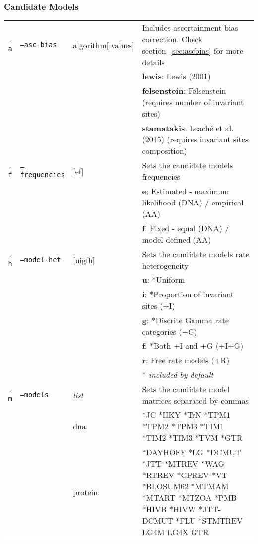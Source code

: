 \subsubsection{Candidate Models}

  \begin{tabular}{rllp{}}
    \hline
    \texttt{-a} & \texttt{--asc-bias} & algorithm[:values] & Includes ascertainment bias correction. Check section~\ref{sec:ascbias} for more details \\
                                     &&&  {\bf lewis}: Lewis (2001) \\
                                     &&&  {\bf felsenstein}: Felsenstein (requires number of invariant sites) \\
                                     &&&  {\bf stamatakis}: Leaché et al. (2015) (requires invariant sites composition) \\
     \texttt{-f} & \texttt{--frequencies} & [ef]           & Sets the candidate models frequencies \\
                                     &&& {\bf e}: Estimated - maximum likelihood (DNA) / empirical (AA) \\
                                     &&& {\bf f}: Fixed - equal (DNA) / model defined (AA) \\
     \texttt{-h} & \texttt{--model-het} & [uigfh] & Sets the candidate models rate heterogeneity \\
                                     &&& {\bf u}: *Uniform \\
                                     &&& {\bf i}: *Proportion of invariant sites (+I) \\
                                     &&& {\bf g}: *Discrite Gamma rate categories (+G) \\
                                     &&& {\bf f}: *Both +I and +G (+I+G) \\
                                     &&& {\bf r}: Free rate models (+R) \\
                                     &&& * {\it included by default} \\
     \texttt{-m} & \texttt{--models}  & {\em list} & Sets the candidate model matrices separated by commas \\
                                      && dna: & *JC *HKY *TrN *TPM1 *TPM2 *TPM3 *TIM1 *TIM2 *TIM3 *TVM *GTR \\
                                      && protein: & *DAYHOFF *LG *DCMUT *JTT *MTREV *WAG *RTREV *CPREV *VT *BLOSUM62 *MTMAM *MTART *MTZOA *PMB *HIVB *HIVW *JTT-DCMUT *FLU *STMTREV LG4M LG4X GTR \\

\end{tabular}
